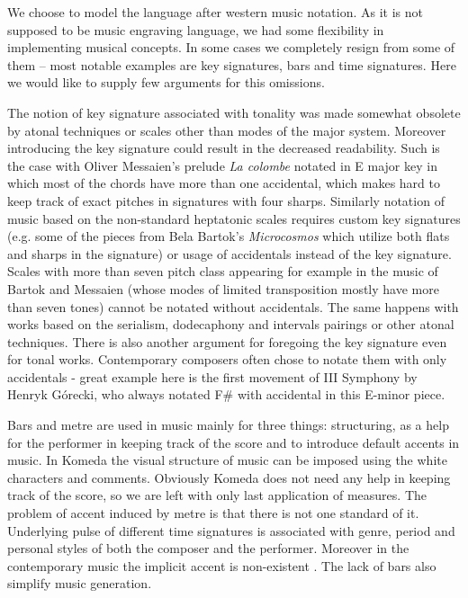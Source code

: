 \documentclass{article}
\begin{document}
We choose to model the language after western music notation. As it is not
supposed to be music engraving language, we had some flexibility in
implementing musical concepts. In some cases we completely resign from some of
them -- most notable examples are key signatures, bars and time signatures.
Here we would like to supply few arguments for this omissions.

The notion of key signature associated with tonality was made somewhat obsolete
by atonal techniques or scales other than modes of the major system. Moreover
introducing the key signature could result in the decreased readability. Such
is the case with Oliver Messaien's prelude {\it La colombe} notated in E major
key in which most of the chords have more than one accidental, which makes hard
to keep track of exact pitches in signatures with four sharps.  Similarly
notation of music based on the non-standard heptatonic scales requires custom
key signatures (e.g. some of the pieces from Bela Bartok's {\it Microcosmos}
which utilize both flats and sharps in the signature) or usage of accidentals
instead of the key signature.  Scales with more than seven pitch class
appearing for example  in the music of Bartok \cite{bela1} \cite{bela2} and
Messaien (whose modes of limited transposition \cite{mess} mostly have more
than seven tones) cannot be notated without accidentals. The same happens with
works based on the serialism, dodecaphony and intervals pairings \cite{lutos}
or other atonal techniques. There is also another argument for foregoing the
key signature even for tonal works. Contemporary composers often chose to
notate them with only accidentals - great example here is the first movement of
III Symphony by Henryk G\'{o}recki, who always notated F\# with accidental in
this E-minor piece.

Bars and metre are used in music mainly for three things: structuring, as a
help for the performer in keeping track of the score and to introduce default
accents in music. In Komeda the visual structure of music can be imposed using
the white characters and comments. Obviously Komeda does not need any help in
keeping track of the score, so we are left with only last application of
measures. The problem of accent induced by metre is that there is not one
standard of it. Underlying pulse of different time signatures is associated
with genre, period and personal styles of both the composer and the performer.
Moreover in the contemporary music the implicit accent is non-existent
\cite{harm}. The lack of bars also simplify music generation.
\end{document}
